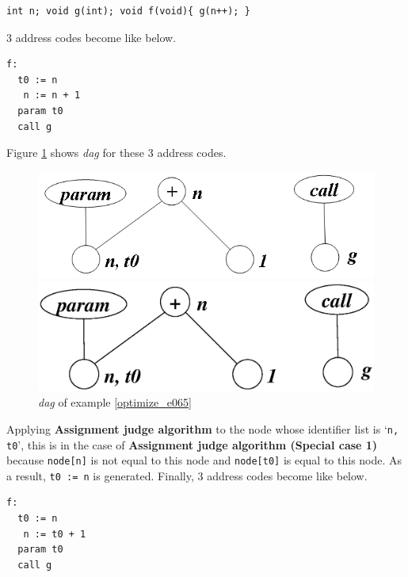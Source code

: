 \begin{Example}
\label{optimize_e065}
\begin{verbatim}
int n; void g(int); void f(void){ g(n++); }
\end{verbatim}
3 address codes become like below.
\begin{verbatim}
f:
  t0 := n
   n := n + 1
  param t0
  call g
\end{verbatim}
Figure \ref{optimize_e066} shows {\em dag} for these 3 address codes.
\begin{figure}[htbp]
\begin{center}
\begin{htmlonly}
\includegraphics[width=1.0\linewidth,height=0.328\linewidth]{opt027.png}
\end{htmlonly}
\begin{latexonly}
\includegraphics[width=1.0\linewidth,height=0.328\linewidth]{opt027.eps}
\end{latexonly}
\caption{{\em dag} of example \ref{optimize_e065}}
\label{optimize_e066}
\end{center}
\end{figure}
Applying {\bf Assignment judge
 algorithm} to the node whose identifier list is `{\tt{n, t0}}',
this is in the case
of {\bf Assignment judge algorithm (Special case 1)}
because {\tt{node[n]}} is not equal to this node and
{\tt{node[t0]}} is equal to this node.
As a result, {\tt{t0 := n}} is generated.
Finally, 3 address codes become like below.
\begin{verbatim}
f:
  t0 := n
   n := t0 + 1
  param t0
  call g
\end{verbatim}
\end{Example}

